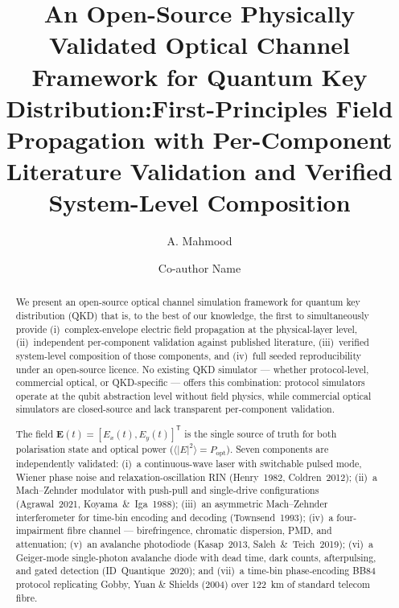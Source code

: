 \documentclass[3p,times,preprint]{elsarticle}
\begin{document}
\begin{frontmatter}

\title{An Open-Source Physically Validated Optical Channel Framework for Quantum Key Distribution:\break First-Principles Field Propagation with Per-Component Literature Validation and Verified System-Level Composition}

\author[1]{A. Mahmood}

\author[2]{Co-author Name}

\address[1]{Department of Physics, University Name, City, Country}
\address[2]{Department of Electrical Engineering, Another University, City, Country}

\begin{abstract}
We present an open-source optical channel simulation framework for quantum
key distribution (QKD) that is, to the best of our knowledge, the first to
simultaneously provide (i)~complex-envelope electric field propagation at
the physical-layer level, (ii)~independent per-component validation against
published literature, (iii)~verified system-level composition of those
components, and (iv)~full seeded reproducibility under an open-source licence.
No existing QKD simulator --- whether protocol-level, commercial optical, or
QKD-specific --- offers this combination: protocol simulators operate at the
qubit abstraction level without field physics, while commercial optical
simulators are closed-source and lack transparent per-component validation.

The field $\mathbf{E}(t)=[E_x(t),E_y(t)]^\mathsf{T}$ is the single source of
truth for both polarisation state and optical power ($\langle|E|^2\rangle =
P_{\text{opt}}$).  Seven components are independently validated:
(i)~a continuous-wave laser with switchable pulsed mode, Wiener phase noise
and relaxation-oscillation RIN (Henry~1982, Coldren~2012);
(ii)~a Mach--Zehnder modulator with push-pull and single-drive configurations
(Agrawal~2021, Koyama~\&~Iga~1988);
(iii)~an asymmetric Mach--Zehnder interferometer for time-bin encoding and
decoding (Townsend~1993);
(iv)~a four-impairment fibre channel --- birefringence, chromatic dispersion,
PMD, and attenuation;
(v)~an avalanche photodiode (Kasap~2013, Saleh~\&~Teich~2019);
(vi)~a Geiger-mode single-photon avalanche diode with dead time,
dark counts, afterpulsing, and gated detection (ID~Quantique~2020); and
(vii)~a time-bin phase-encoding BB84 protocol replicating Gobby, Yuan \&
Shields (2004) over 122~km of standard telecom fibre.


\end{abstract}
\end{frontmatter}
\end{document}
